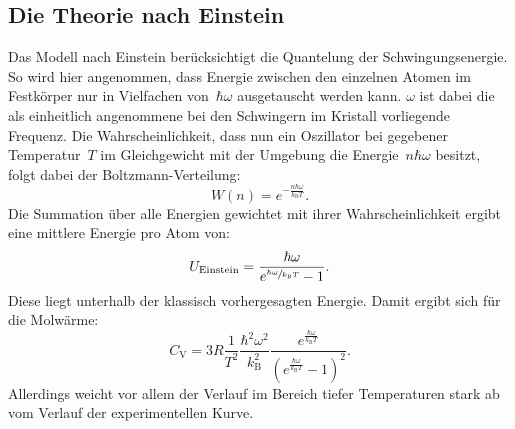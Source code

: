 \documentclass[
  bibliography=totoc,     %
  captions=tableheading,  %
  titlepage=firstiscover, %
]{scrartcl}
\begin{document}
\subsection{Die Theorie nach Einstein}
%
Das Modell nach Einstein berücksichtigt die Quantelung der Schwingungsenergie. So
wird hier angenommen, dass Energie zwischen den einzelnen Atomen im Festkörper
nur in Vielfachen von~$\hbar\omega$ ausgetauscht werden kann. $\omega$ ist dabei
die als einheitlich angenommene bei den Schwingern im Kristall vorliegende
Frequenz. Die Wahrscheinlichkeit, dass nun ein Oszillator bei gegebener
Temperatur~$T$ im Gleichgewicht mit der Umgebung die Energie~$n\hbar\omega$
besitzt, folgt dabei der Boltzmann-Verteilung:
%
\begin{equation}
  W(n)=e^{-\frac{n\hbar\omega}{k_{\mathrm{B}}T}}.
\end{equation}
%
Die Summation über alle Energien gewichtet mit ihrer Wahrscheinlichkeit ergibt
eine mittlere Energie pro Atom von:
%
\begin{equation}
  U_{\text{Einstein}}=\frac{\hbar\omega}{e^{\sfrac{\hbar\omega}{k_{\mathrm{B}}T}}-1}.
\end{equation}
%
Diese liegt unterhalb der klassisch vorhergesagten Energie. Damit ergibt sich
für die Molwärme:
%
\begin{equation}
  C_{\mathrm{V}}=3R\frac{1}{T^2}\frac{\hbar^2\omega^2}{k_{\mathrm{B}}^2}\frac{e^{\frac{\hbar\omega}{k_{\mathrm{B}}T}}}{(e^{\frac{\hbar\omega}{k_{\mathrm{B}}T}}-1)^2}.
\end{equation}
Allerdings weicht vor allem der Verlauf im Bereich tiefer Temperaturen stark ab
vom Verlauf der experimentellen Kurve.
\end{document}
